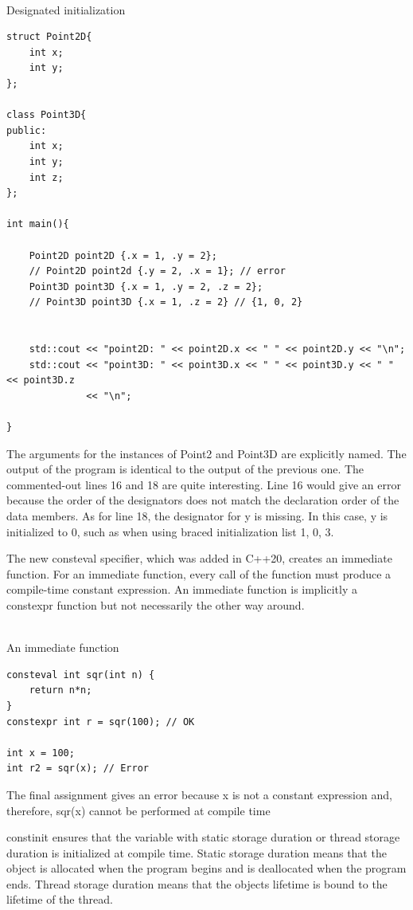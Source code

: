 \hspace*{\fill} \\ %
\noindent
Designated initialization
\begin{lstlisting}[style=styleCXX]
struct Point2D{
	int x;
	int y;
};

class Point3D{
public:
	int x;
	int y;
	int z;
};

int main(){

	Point2D point2D {.x = 1, .y = 2};
	// Point2D point2d {.y = 2, .x = 1}; // error
	Point3D point3D {.x = 1, .y = 2, .z = 2};
	// Point3D point3D {.x = 1, .z = 2} // {1, 0, 2}


	std::cout << "point2D: " << point2D.x << " " << point2D.y << "\n";
	std::cout << "point3D: " << point3D.x << " " << point3D.y << " " << point3D.z
		      << "\n";

}
\end{lstlisting}

The arguments for the instances of Point2 and Point3D are explicitly named. The output of the program is identical to the output of the previous one. The commented-out lines 16 and 18 are quite interesting. Line 16 would give an error because the order of the designators does not match the declaration order of the data members. As for line 18, the designator for y is missing. In this case, y is initialized to 0, such as when using braced initialization list {1, 0, 3}.


The new consteval specifier, which was added in C++20, creates an immediate function. For an immediate function, every call of the function must produce a compile-time constant expression.
An immediate function is implicitly a constexpr function but not necessarily the other way around.

\hspace*{\fill} \\ %
\noindent
An immediate function
\begin{lstlisting}[style=styleCXX]
consteval int sqr(int n) {
	return n*n;
}
constexpr int r = sqr(100); // OK

int x = 100;
int r2 = sqr(x); // Error
\end{lstlisting}

The final assignment gives an error because x is not a constant expression and, therefore, sqr(x) cannot be performed at compile time 

constinit ensures that the variable with static storage duration or thread storage duration is initialized at compile time. Static storage duration means that the object is allocated when the program begins and is deallocated when the program ends. Thread storage duration means that the objects lifetime is bound to the lifetime of the thread.

